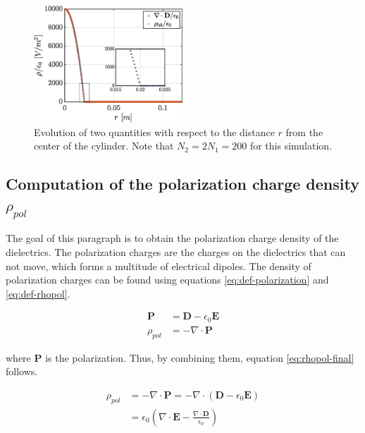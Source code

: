 \documentclass[a4paper,12pt,twoside]{article}
\newcommand{\mbf}[1]{\mathbf{#1}} %
\newcommand{\Div}[1]{\nabla\cdot\mathbf{#1}}
\newcommand{\bracket}[1]{\left(#1\right)}
\begin{document}

  \begin{figure}[h]
    \centering
    \includegraphics[width=0.5\textwidth]{graphs/exd2-diff.eps}
    \caption{Evolution of two quantities with respect to the distance $r$ from the center of the cylinder. Note that $N_2=2N_1=200$ for this simulation.} %
    \label{fig:d2}
  \end{figure}

  \subsection{Computation of the polarization charge density $\rho_{pol}$} \label{sec:rhopol}
    The goal of this paragraph is to obtain the polarization charge density of the dielectrics.
    The polarization charges are the charges on the dielectrics that can not move, which forms a multitude of electrical dipoles. \cite{feynman:dielectrics}
    The density of polarization charges can be found using equations \eqref{eq:def-polarization} and \eqref{eq:def-rhopol}.

    \begin{align}
      \mbf{P} &= \mbf{D} - \epsilon_0\mbf{E}
      \label{eq:def-polarization} \\
      \rho_{pol} &= -\Div{\mbf{P}}
      \label{eq:def-rhopol}
    \end{align}

    where $\mbf{P}$ is the polarization.
    Thus, by combining them, equation \eqref{eq:rhopol-final} follows.

    \begin{align*}
      \rho_{pol} &= -\Div{\mbf{P}} = -\nabla\cdot\bracket{\mbf{D} - \epsilon_0\mbf{E}}\\
                 &= \epsilon_0\bracket{\Div{E} - \frac{\Div{D}}{\epsilon_0}}
    \end{align*}
\end{document}
